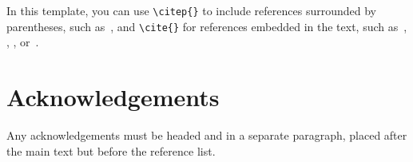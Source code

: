 \documentclass{article}
\begin{document}
In this template, you can use \verb=\citep{}= to include references surrounded by parentheses, such as~\citep{KneesS16_MusicSimilarityRetrieval_SPRINGER}, and \verb=\cite{}=
for references embedded in the text,
such as~\cite{WeihsJVR16_MusicDataAnalysis_CRC},
\cite{SerraEtAl13_RoadmapMIR_CreativeCommon},
\cite{Lerch15_AudioContentAnalysis_WILEY},
or~\cite{Mueller15_FMP_SPRINGER}.
%
%
\section*{Acknowledgements}

Any acknowledgements must be headed and in a separate paragraph, placed after the main text but before the reference list.
%
%

%
%
%
%
%
%
\end{document}
